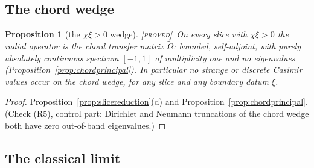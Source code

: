 \documentclass[11pt,a4paper]{article}
\newcommand{\PROVED}{{\color{ForestGreen}\textsc{[proved]}}}
\theoremstyle{definition}
\theoremstyle{plain}
\newtheorem{proposition}[definition]{Proposition}
\newcommand{\tCas}{\tilde\Omega}                %
\begin{document}
\subsection{The chord wedge}

\begin{proposition}[the $\chi\xi>0$ wedge]\label{prop:chordwedge}
\PROVED\ On every slice with $\chi\xi>0$ the radial operator is the chord transfer matrix
$\tCas$: bounded, self-adjoint, with purely absolutely continuous spectrum $[-1,1]$ of
multiplicity one and \emph{no} eigenvalues (Proposition~\ref{prop:chordprincipal}). In
particular no strange or discrete Casimir values occur on the chord wedge, for any slice and
any boundary datum $\xi$.
\end{proposition}

\begin{proof}
Proposition~\ref{prop:slicereduction}(d) and Proposition~\ref{prop:chordprincipal}. (Check
(R5), control part: Dirichlet and Neumann truncations of the chord wedge both have zero
out-of-band eigenvalues.)
\end{proof}

\subsection{The classical limit}
\label{sec:radialclassical}
\end{document}
